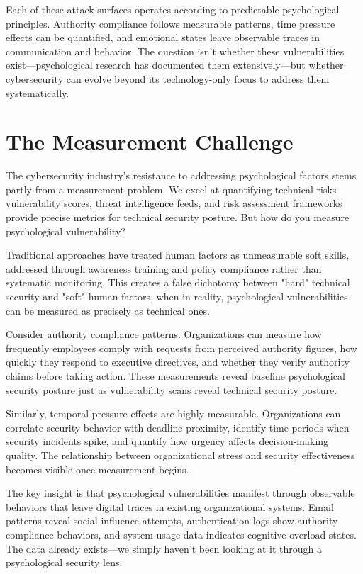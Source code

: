 \documentclass[10pt, twocolumn]{article}
\begin{document}
Each of these attack surfaces operates according to predictable psychological principles. Authority compliance follows measurable patterns, time pressure effects can be quantified, and emotional states leave observable traces in communication and behavior. The question isn't whether these vulnerabilities exist—psychological research has documented them extensively—but whether cybersecurity can evolve beyond its technology-only focus to address them systematically.

\section{The Measurement Challenge}

The cybersecurity industry's resistance to addressing psychological factors stems partly from a measurement problem. We excel at quantifying technical risks—vulnerability scores, threat intelligence feeds, and risk assessment frameworks provide precise metrics for technical security posture. But how do you measure psychological vulnerability?

Traditional approaches have treated human factors as unmeasurable soft skills, addressed through awareness training and policy compliance rather than systematic monitoring. This creates a false dichotomy between "hard" technical security and "soft" human factors, when in reality, psychological vulnerabilities can be measured as precisely as technical ones.

Consider authority compliance patterns. Organizations can measure how frequently employees comply with requests from perceived authority figures, how quickly they respond to executive directives, and whether they verify authority claims before taking action. These measurements reveal baseline psychological security posture just as vulnerability scans reveal technical security posture.

Similarly, temporal pressure effects are highly measurable. Organizations can correlate security behavior with deadline proximity, identify time periods when security incidents spike, and quantify how urgency affects decision-making quality. The relationship between organizational stress and security effectiveness becomes visible once measurement begins.

The key insight is that psychological vulnerabilities manifest through observable behaviors that leave digital traces in existing organizational systems. Email patterns reveal social influence attempts, authentication logs show authority compliance behaviors, and system usage data indicates cognitive overload states. The data already exists—we simply haven't been looking at it through a psychological security lens.
\end{document}
